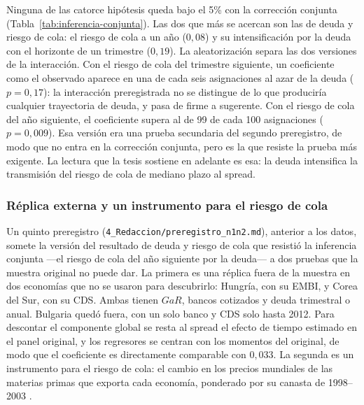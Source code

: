 Ninguna de las catorce hipótesis queda bajo el 5\% con la corrección conjunta (Tabla~\ref{tab:inferencia-conjunta}). Las dos que más se acercan son las de deuda y riesgo de cola: el riesgo de cola a un año ($0{,}08$) y su intensificación por la deuda con el horizonte de un trimestre ($0{,}19$). La aleatorización separa las dos versiones de la interacción. Con el riesgo de cola del trimestre siguiente, un coeficiente como el observado aparece en una de cada seis asignaciones al azar de la deuda ($p=0{,}17$): la interacción preregistrada no se distingue de lo que produciría cualquier trayectoria de deuda, y pasa de firme a sugerente. Con el riesgo de cola del año siguiente, el coeficiente supera al de 99 de cada 100 asignaciones ($p=0{,}009$). Esa versión era una prueba secundaria del segundo preregistro, de modo que no entra en la corrección conjunta, pero es la que resiste la prueba más exigente. La lectura que la tesis sostiene en adelante es esa: la deuda intensifica la transmisión del riesgo de cola de mediano plazo al spread.

\subsubsection{Réplica externa y un instrumento para el riesgo de cola}
\label{sec:n1n2}

Un quinto preregistro (\texttt{4\_Redaccion/preregistro\_n1n2.md}), anterior a los datos, somete la versión del resultado de deuda y riesgo de cola que resistió la inferencia conjunta ---el riesgo de cola del año siguiente por la deuda--- a dos pruebas que la muestra original no puede dar. La primera es una réplica fuera de la muestra en dos economías que no se usaron para descubrirlo: Hungría, con su EMBI, y Corea del Sur, con su CDS. Ambas tienen $GaR$, bancos cotizados y deuda trimestral o anual. Bulgaria quedó fuera, con un solo banco y CDS solo hasta 2012. Para descontar el componente global se resta al spread el efecto de tiempo estimado en el panel original, y los regresores se centran con los momentos del original, de modo que el coeficiente es directamente comparable con $0{,}033$. La segunda es un instrumento para el riesgo de cola: el cambio en los precios mundiales de las materias primas que exporta cada economía, ponderado por su canasta de 1998--2003 \citep{Gruss2014}.

